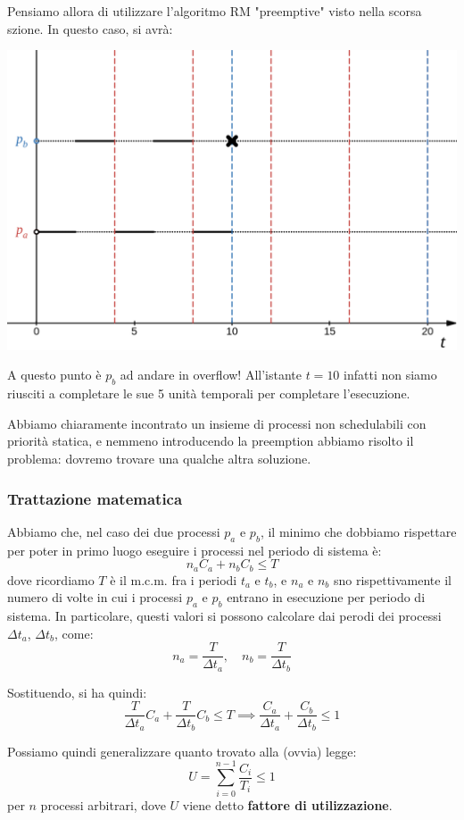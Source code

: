 \documentclass[a4paper,11pt]{article}
\begin{document}
Pensiamo allora di utilizzare l'algoritmo RM "preemptive" visto nella scorsa szione. In questo caso, si avrà:
\begin{center}
	\includegraphics[scale=0.3]{../figures/rm_pre_fail.png}
\end{center}

A questo punto è $p_b$ ad andare in overflow! All'istante $t = 10$ infatti non siamo riusciti a completare le sue 5 unità temporali per completare l'esecuzione.

Abbiamo chiaramente incontrato un insieme di processi non schedulabili con priorità statica, e nemmeno introducendo la preemption abbiamo risolto il problema: dovremo trovare una qualche altra soluzione.

\subsubsection{Trattazione matematica}
Abbiamo che, nel caso dei due processi $p_a$ e $p_b$, il minimo che dobbiamo rispettare per poter in primo luogo eseguire i processi nel periodo di sistema è:
$$
n_a C_a + n_b C_b \leq T
$$
dove ricordiamo $T$ è il m.c.m. fra i periodi $t_a$ e $t_b$, e $n_a$ e $n_b$ sno rispettivamente il numero di volte in cui i processi $p_a$ e $p_b$ entrano in esecuzione per periodo di sistema.
In particolare, questi valori si possono calcolare dai perodi dei processi $\Delta t_a$, $\Delta t_b$, come:
$$
n_a = \frac{T}{\Delta t_a}, \quad n_b = \frac{T}{\Delta t_b}
$$

Sostituendo, si ha quindi:
$$
\frac{T}{\Delta t_a} C_a + \frac{T}{\Delta t_b} C_b \leq T \implies
\frac{C_a}{\Delta t_a} + \frac{C_b}{\Delta t_b} \leq 1
$$

Possiamo quindi generalizzare quanto trovato alla (ovvia) legge:
$$
U = \sum_{i = 0}^{n - 1} \frac{C_i}{T_i} \leq 1
$$
per $n$ processi arbitrari, dove $U$ viene detto \textbf{fattore di utilizzazione}.
\end{document}
